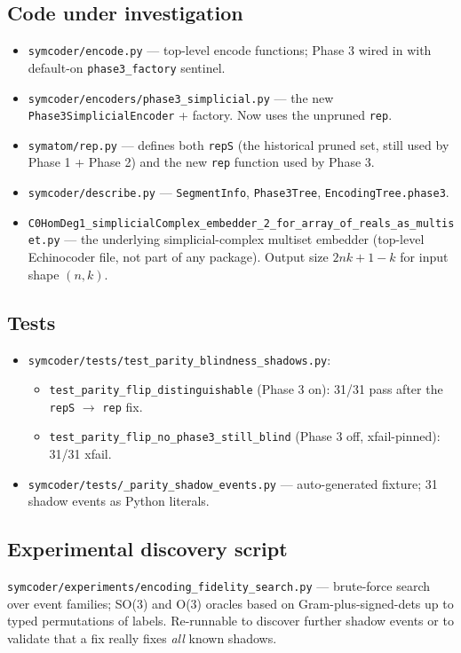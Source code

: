 \documentclass[a4paper,11pt]{article}
\begin{document}
\subsection{Code under investigation}
\begin{itemize}[nosep]
  \item \texttt{symcoder/encode.py} --- top-level encode functions; Phase 3
        wired in with default-on \texttt{phase3\_factory} sentinel.
  \item \texttt{symcoder/encoders/phase3\_simplicial.py} --- the new
        \texttt{Phase3SimplicialEncoder} + factory.  Now uses the
        unpruned \texttt{rep}.
  \item \texttt{symatom/rep.py} --- defines both \texttt{repS} (the
        historical pruned set, still used by Phase 1 + Phase 2) and the
        new \texttt{rep} function used by Phase 3.
  \item \texttt{symcoder/describe.py} --- \texttt{SegmentInfo},
        \texttt{Phase3Tree}, \texttt{EncodingTree.phase3}.
  \item \texttt{C0HomDeg1\_simplicialComplex\_embedder\_2\_for\_array\_of\_reals\_as\_multiset.py}
        --- the underlying simplicial-complex multiset embedder
        (top-level Echinocoder file, not part of any package).
        Output size $2nk+1-k$ for input shape $(n,k)$.
\end{itemize}

\subsection{Tests}
\begin{itemize}[nosep]
  \item \texttt{symcoder/tests/test\_parity\_blindness\_shadows.py}:
    \begin{itemize}[nosep]
      \item \texttt{test\_parity\_flip\_distinguishable} (Phase 3 on):
            31/31 pass after the \texttt{repS} $\to$ \texttt{rep} fix.
      \item \texttt{test\_parity\_flip\_no\_phase3\_still\_blind}
            (Phase 3 off, xfail-pinned): 31/31 xfail.
    \end{itemize}
  \item \texttt{symcoder/tests/\_parity\_shadow\_events.py} ---
        auto-generated fixture; 31 shadow events as Python literals.
\end{itemize}

\subsection{Experimental discovery script}
\texttt{symcoder/experiments/encoding\_fidelity\_search.py} ---
brute-force search over event families; SO(3) and O(3) oracles based
on Gram-plus-signed-dets up to typed permutations of labels.
Re-runnable to discover further shadow events or to validate that a
fix really fixes \emph{all} known shadows.
\end{document}
